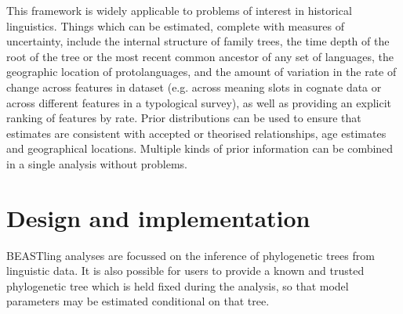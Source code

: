 \documentclass[twocolumn,10pt]{scrartcl}
\begin{document}
This framework is widely applicable to problems of interest in historical linguistics.  Things which can be estimated, complete with measures of uncertainty, include the internal structure of family trees, the time depth of the root of the tree or the most recent common ancestor of any set of languages, the geographic location of protolanguages, and the amount of variation in the rate of change across features in dataset (e.g. across meaning slots in cognate data or across different features in a typological survey), as well as providing an explicit ranking of features by rate.  Prior distributions can be used to ensure that estimates are consistent with accepted or theorised relationships, age estimates and geographical locations.  Multiple kinds of prior information can be combined in a single analysis without problems.

\section{Design and implementation}

BEASTling analyses are focussed on the inference of phylogenetic trees from linguistic data.  It is also possible for users to provide a known and trusted phylogenetic tree which is held fixed during the analysis, so that model parameters may be estimated conditional on that tree.
\end{document}
